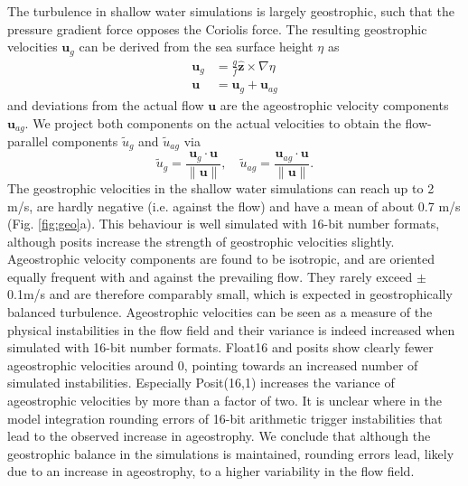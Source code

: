 The turbulence in shallow water simulations is largely geostrophic, such that the
pressure gradient force opposes the Coriolis force. The resulting geostrophic
velocities $\mathbf{u}_g$ can be derived from the sea surface height $\eta$ as
\begin{subequations}
\begin{align}
\mathbf{u}_g &= \frac{g}{f}\hat{\mathbf{z}} \times \nabla \eta \\
\mathbf{u} &= \mathbf{u}_{g} + \mathbf{u}_{ag}
\end{align}
\label{eq:geo}%
\end{subequations}
and deviations from the actual flow $\mathbf{u}$ are the ageostrophic velocity
components $\mathbf{u}_{ag}$. We project both components on the actual velocities
to obtain the flow-parallel components $\tilde{u}_{g}$ and $\tilde{u}_{ag}$ via
\begin{equation}
\tilde{u}_g = \frac{\mathbf{u}_g \cdot \mathbf{u}}{\| \mathbf{u} \|},
\quad \tilde{u}_{ag} = \frac{\mathbf{u}_{ag} \cdot \mathbf{u}}{\| \mathbf{u} \|}.
\label{eq:parallel}%
\end{equation}
The geostrophic velocities in the shallow water simulations can reach up to 2 m/s,
are hardly negative (i.e. against the flow) and have a mean of about 0.7 m/s
(Fig. \ref{fig:geo}a). This behaviour is well simulated with 16-bit number formats,
although posits increase the strength of geostrophic velocities slightly. Ageostrophic
velocity components are found to be isotropic, and are oriented equally frequent
with and against the prevailing flow. They rarely exceed $\pm$0.1m/s and are
therefore comparably small, which is expected in geostrophically balanced turbulence.
Ageostrophic velocities can be seen as a measure of the physical instabilities in
the flow field and their variance is indeed increased when simulated with
16-bit number formats. Float16 and posits show clearly fewer ageostrophic velocities
around 0, pointing towards an increased number of simulated instabilities.
Especially Posit(16,1) increases the variance of ageostrophic velocities by more
than a factor of two. It is unclear where in the model integration rounding errors
of 16-bit arithmetic trigger instabilities that lead to the observed increase in
ageostrophy. We conclude that although the geostrophic balance in the simulations
is maintained, rounding errors lead, likely due to an increase in ageostrophy,
to a higher variability in the flow field.

